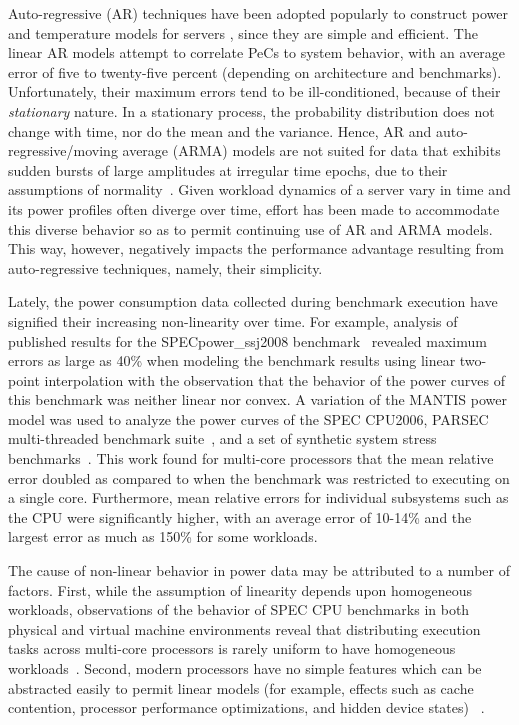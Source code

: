 \documentclass[prodmode,acmtaco,pdftex]{acmsmall}
\begin{document}
Auto-regressive (AR) techniques have been adopted popularly to construct
power and temperature models for servers
\cite{Coskun2008,Powell2009,Bircher2011}, since they are simple and
efficient.  The linear AR models attempt to correlate PeCs to system
behavior, with an average error of five to twenty-five percent
(depending on architecture and benchmarks).  Unfortunately, their
maximum errors tend to be ill-conditioned, because of their
\textit{stationary} nature.  In a stationary process, the probability
distribution does not change with time, nor do the mean and the
variance.  Hence, AR and auto-regressive/moving average (ARMA) models
are not suited for data that exhibits sudden bursts of large amplitudes
at irregular time epochs, due to their assumptions of
normality~\cite{Tong1993}.  Given workload dynamics of a server vary in
time and its power profiles often diverge over time, effort has been
made to accommodate this diverse behavior
\cite{MesaMartinez2007,Coskun2008} so as to permit continuing use of AR
and ARMA models.  This way, however, negatively impacts the performance
advantage resulting from auto-regressive techniques, namely, their
simplicity.

Lately, the power consumption data collected during benchmark execution
have signified their increasing non-linearity over time. For example,
analysis of published results for the SPECpower\_ssj2008
benchmark~\cite{Varsampoulos2010,Hsu2011} revealed maximum errors as
large as 40\% when modeling the benchmark results using linear two-point
interpolation with the observation that the behavior of the power
curves of this benchmark was neither linear nor
convex.  A variation of the MANTIS power model \cite{Economou2006} was
used to analyze the power curves of the SPEC CPU2006, PARSEC
multi-threaded benchmark suite~\cite{Bienia2011}, and a set of synthetic
system stress benchmarks~\cite{McCullough2011}.  This work found for
multi-core processors that the mean relative error doubled as compared
to when the benchmark was restricted to executing on a single core.
Furthermore, mean relative errors for individual subsystems such as the
CPU were significantly higher, with an average error of 10-14\% and the
largest error as much as 150\% for some workloads.

The cause of non-linear behavior in power data may be attributed to a
number of factors.  First, while the assumption of linearity depends
upon homogeneous workloads, observations of the behavior of SPEC CPU
benchmarks in both physical and virtual machine environments reveal that
distributing execution tasks across multi-core processors is rarely
uniform to have homogeneous workloads~\cite{Kansal2010}.  Second, modern
processors have no simple features which can be abstracted
easily to permit linear models (for example, effects such as cache
contention, processor performance optimizations, and hidden device
states) ~\cite{McCullough2011}.
\end{document}
